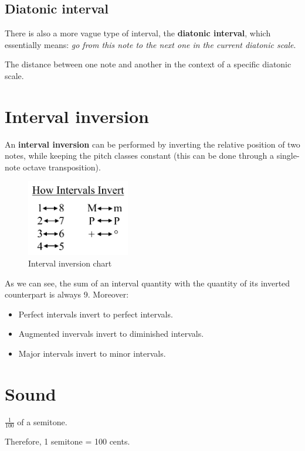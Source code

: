 \subsection{Diatonic interval}
There is also a more vague type of interval, the \textbf{diatonic interval}, which essentially means: \emph{go from this note to the next one in the current diatonic scale}.

\begin{definition}
    The distance between one note and another in the context of a specific diatonic scale.
\end{definition}

\section{Interval inversion}
An \textbf{interval inversion} can be performed by inverting the relative position of two notes, while keeping the pitch classes constant (this can be done through a single-note octave transposition).

\begin{figure}
    \begin{center}
        \includegraphics[width=0.4\textwidth]{img/inversion}
        \caption{Interval inversion chart}
    \end{center}
\end{figure}

As we can see, the sum of an interval quantity with the quantity of its inverted counterpart is always 9. Moreover:
\begin{itemize}
    \item Perfect intervals invert to perfect intervals.
    \item Augmented invervals invert to diminished intervals.
    \item Major intervals invert to minor intervals.
\end{itemize}

\section{Sound}

\begin{definition}[Cent]
    $\frac{1}{100}$ of a semitone.
    
    Therefore, 1 semitone = 100 cents.
\end{definition}